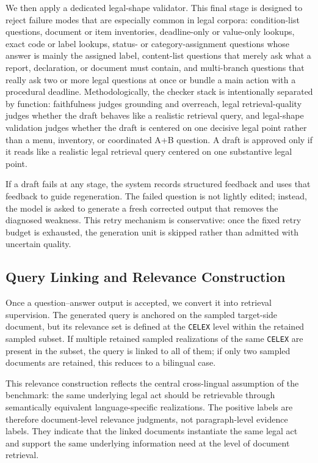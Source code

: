 We then apply a dedicated legal-shape validator. This final stage is designed to reject failure modes that are especially common in legal corpora: condition-list questions, document or item inventories, deadline-only or value-only lookups, exact code or label lookups, status- or category-assignment questions whose answer is mainly the assigned label, content-list questions that merely ask what a report, declaration, or document must contain, and multi-branch questions that really ask two or more legal questions at once or bundle a main action with a procedural deadline. Methodologically, the checker stack is intentionally separated by function: faithfulness judges grounding and overreach, legal retrieval-quality judges whether the draft behaves like a realistic retrieval query, and legal-shape validation judges whether the draft is centered on one decisive legal point rather than a menu, inventory, or coordinated A+B question. A draft is approved only if it reads like a realistic legal retrieval query centered on one substantive legal point.

If a draft fails at any stage, the system records structured feedback and uses that feedback to guide regeneration. The failed question is not lightly edited; instead, the model is asked to generate a fresh corrected output that removes the diagnosed weakness. This retry mechanism is conservative: once the fixed retry budget is exhausted, the generation unit is skipped rather than admitted with uncertain quality.

\subsection{Query Linking and Relevance Construction}

Once a question--answer output is accepted, we convert it into retrieval supervision. The generated query is anchored on the sampled target-side document, but its relevance set is defined at the \texttt{CELEX} level within the retained sampled subset. If multiple retained sampled realizations of the same \texttt{CELEX} are present in the subset, the query is linked to all of them; if only two sampled documents are retained, this reduces to a bilingual case.

This relevance construction reflects the central cross-lingual assumption of the benchmark: the same underlying legal act should be retrievable through semantically equivalent language-specific realizations. The positive labels are therefore document-level relevance judgments, not paragraph-level evidence labels. They indicate that the linked documents instantiate the same legal act and support the same underlying information need at the level of document retrieval.


